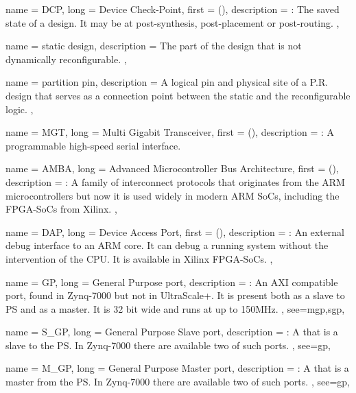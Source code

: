{
	name = {DCP},
	long = {Device Check-Point},
	first = { ()},
	description = {\emph{}:
		The saved state of a design. It may be at post-synthesis, post-placement or post-routing.
	},
}

{
	name = {static design},
	description = {
		The part of the design that is not dynamically reconfigurable.
	},
}

{
	name = {partition pin},
	description = {
		A logical pin and physical site of a P.R. design that 
		serves as a connection point between the static and the reconfigurable logic.
	},
}

{
	name = {MGT},
	long = {Multi Gigabit Transceiver},
	first = { ()},
	description = {\emph{}:
		A programmable high-speed serial interface.
	}
}

{
	name = {AMBA},
	long = {Advanced Microcontroller Bus Architecture},
	first = { ()},
	description = {\emph{}:
		A family of interconnect protocols that originates 
		from the ARM microcontrollers but now it is used widely
		in modern ARM SoCs, including the FPGA-SoCs from Xilinx.
	},
}


{
	name = {DAP},
	long = {Device Access Port},
	first = { ()},
	description = {\emph{}:
		An external debug interface to an ARM core. It can debug a running system
		without the intervention of the CPU. It is available in Xilinx FPGA-SoCs.
	},
}

{
	name = {GP},
	long = {General Purpose port},
	description = {\emph{}:
		An AXI compatible port, found in Zynq-7000 but not in UltraScale+.
		It is present both as a slave to PS and as a master. 
		It is 32 bit wide and runs at up to 150MHz.
	},
	see={mgp,sgp},
}

{
	name = {S\_GP},
	long = {General Purpose Slave port},
	description = {\emph{}:
		A  that is a slave to the PS. 
		In Zynq-7000 there are available two of such ports.
	},
	see={gp},
}

{
	name = {M\_GP},
	long = {General Purpose Master port},
	description = {\emph{}:
		A  that is a master from the PS. 
		In Zynq-7000 there are available two of such ports.
	},
	see={gp},
}

